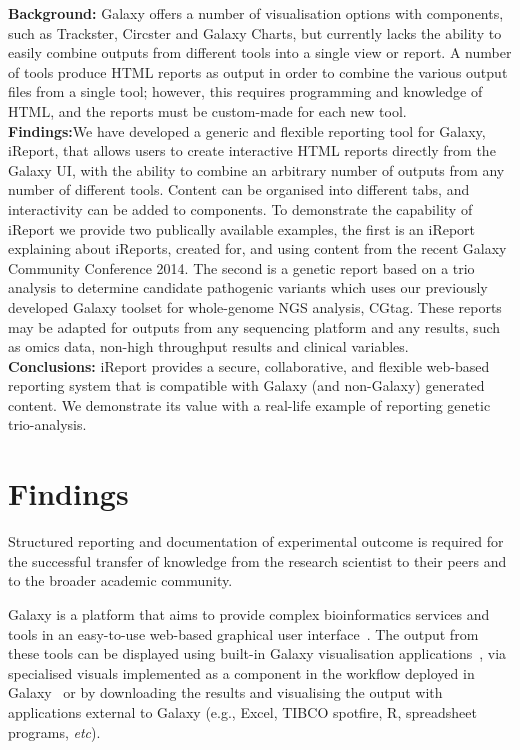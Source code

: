 \textbf{Background:} Galaxy offers a number of visualisation options with components, such as Trackster, Circster and Galaxy Charts, but currently lacks the ability to easily combine outputs from different tools into a single view or report. A number of tools produce HTML reports as output in order to combine the various output files from a single tool; however, this requires programming and knowledge of HTML, and the reports must be custom-made for each new tool.\\
\textbf{Findings:}We have developed a generic and flexible reporting tool for Galaxy, iReport, that allows users to create interactive HTML reports directly from the Galaxy UI, with the ability to combine an arbitrary number of outputs from any number of different tools. Content can be organised into different tabs, and interactivity can be added to components. To demonstrate the capability of iReport we provide two publically available examples, the first is an iReport explaining about iReports, created for, and using content from the recent Galaxy Community Conference 2014. The second is a genetic report based on a trio analysis to determine candidate pathogenic variants which uses our previously developed Galaxy toolset for whole-genome NGS analysis, CGtag. These reports may be adapted for outputs from any sequencing platform and any results, such as omics data, non-high throughput results and clinical variables.\\
\textbf{Conclusions:} iReport provides a secure, collaborative, and flexible web-based reporting system that is compatible with Galaxy (and non-Galaxy) generated content. We demonstrate its value with a real-life example of reporting genetic trio-analysis.


\section*{Findings}

Structured reporting and documentation of experimental outcome is required for the successful transfer of knowledge from the research scientist to their peers and to the broader academic community.

Galaxy is a platform that aims to provide complex bioinformatics services and tools in an easy-to-use web-based graphical user interface~\cite{goecks2010galaxy,blankenberg2010galaxy,giardine2005galaxy}. The output from these tools can be displayed using built-in Galaxy visualisation applications~\cite{goecks2013web}, via specialised visuals implemented as a component in the workflow deployed in Galaxy~\cite{cgtag} or by downloading the results and visualising the output with applications external to Galaxy (e.g., Excel, TIBCO spotfire, R, spreadsheet programs, \emph{etc}).

